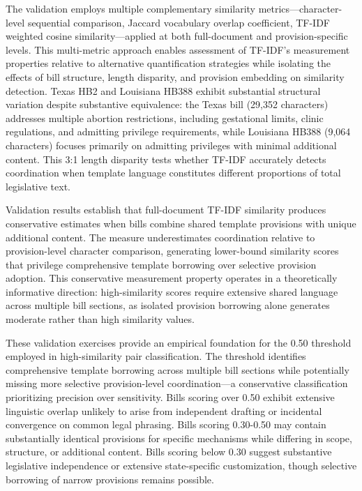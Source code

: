 The validation employs multiple complementary similarity metrics---character-level sequential comparison, Jaccard vocabulary overlap coefficient, TF-IDF weighted cosine similarity---applied at both full-document and provision-specific levels. This multi-metric approach enables assessment of TF-IDF's measurement properties relative to alternative quantification strategies while isolating the effects of bill structure, length disparity, and provision embedding on similarity detection. Texas HB2 and Louisiana HB388 exhibit substantial structural variation despite substantive equivalence: the Texas bill (29,352 characters) addresses multiple abortion restrictions, including gestational limits, clinic regulations, and admitting privilege requirements, while Louisiana HB388 (9,064 characters) focuses primarily on admitting privileges with minimal additional content. This 3:1 length disparity tests whether TF-IDF accurately detects coordination when template language constitutes different proportions of total legislative text.

Validation results establish that full-document TF-IDF similarity produces conservative estimates when bills combine shared template provisions with unique additional content. The measure underestimates coordination relative to provision-level character comparison, generating lower-bound similarity scores that privilege comprehensive template borrowing over selective provision adoption. This conservative measurement property operates in a theoretically informative direction: high-similarity scores require extensive shared language across multiple bill sections, as isolated provision borrowing alone generates moderate rather than high similarity values.

These validation exercises provide an empirical foundation for the 0.50 threshold employed in high-similarity pair classification. The threshold identifies comprehensive template borrowing across multiple bill sections while potentially missing more selective provision-level coordination---a conservative classification prioritizing precision over sensitivity. Bills scoring over 0.50 exhibit extensive linguistic overlap unlikely to arise from independent drafting or incidental convergence on common legal phrasing. Bills scoring 0.30-0.50 may contain substantially identical provisions for specific mechanisms while differing in scope, structure, or additional content. Bills scoring below 0.30 suggest substantive legislative independence or extensive state-specific customization, though selective borrowing of narrow provisions remains possible.


